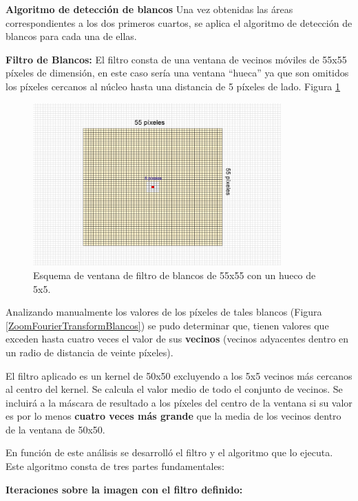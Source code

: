 \documentclass[10pt,a4paper, twoside]{report}
\newcounter{subsubsubsection}[subsubsection]
\begin{document}
\textbf{Algoritmo de detección de blancos}
Una vez obtenidas las áreas correspondientes a los dos primeros cuartos, se aplica el algoritmo de detección de blancos para cada una de ellas.

\textbf{Filtro de Blancos:} El filtro consta de una ventana de vecinos móviles de 55x55 píxeles de dimensión, en este caso sería una ventana "`hueca"' ya que son omitidos los píxeles cercanos al núcleo hasta una distancia de 5 píxeles de lado. Figura \ref{filtroBlancosFourier}

\begin{figure}[!htb]
   \centering      
   \includegraphics[width=0.85\textwidth]{imagenes/filtroBlancosFourier.jpg}
 \caption{Esquema de ventana de filtro de blancos de 55x55 con un hueco de 5x5.}
 \label{filtroBlancosFourier}
\end{figure}

Analizando manualmente los valores de los píxeles de tales blancos (Figura \ref{ZoomFourierTransformBlancos}) se pudo determinar que, tienen valores que exceden hasta cuatro veces el valor de sus \textbf{vecinos} (vecinos adyacentes dentro en un radio de distancia de veinte píxeles). 

 El filtro aplicado es un kernel de 50x50 excluyendo a los 5x5 vecinos más cercanos al centro del kernel. Se calcula el valor medio de todo el conjunto de vecinos. Se incluirá a la máscara de resultado a los píxeles del centro de la ventana si su valor es por lo menos \textbf{cuatro veces más grande} que la media de los vecinos dentro de la ventana de 50x50.

En función de este análisis se desarrolló el filtro y el algoritmo que lo ejecuta. Este algoritmo consta de tres partes fundamentales:

\textbf{Iteraciones sobre la imagen con el filtro definido:}
\end{document}
